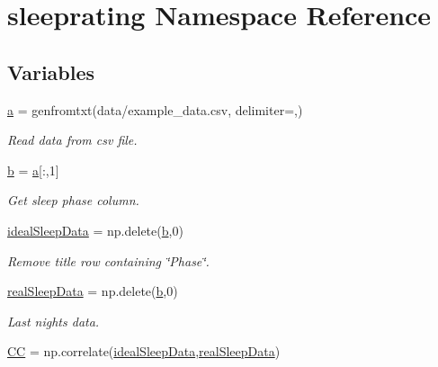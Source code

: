 \hypertarget{namespacesleeprating}{}\section{sleeprating Namespace Reference}
\label{namespacesleeprating}
\subsection*{Variables}
\begin{DoxyCompactItemize}
\item 
\mbox{\hyperlink{namespacesleeprating_a0d156bb774e867fc8ebea212853bd312}{a}} = genfromtxt(\textquotesingle{}data/example\+\_\+data.\+csv\textquotesingle{}, delimiter=\textquotesingle{},\textquotesingle{})
\begin{DoxyCompactList}\small\item\em Read data from csv file. \end{DoxyCompactList}\item 
\mbox{\hyperlink{namespacesleeprating_a0daef533b07f6252a2dad70552a90082}{b}} = \mbox{\hyperlink{namespacesleeprating_a0d156bb774e867fc8ebea212853bd312}{a}}\mbox{[}\+:,1\mbox{]}
\begin{DoxyCompactList}\small\item\em Get sleep phase column. \end{DoxyCompactList}\item 
\mbox{\hyperlink{namespacesleeprating_a9e349b9812b2428e147dc1612fa5126d}{ideal\+Sleep\+Data}} = np.\+delete(\mbox{\hyperlink{namespacesleeprating_a0daef533b07f6252a2dad70552a90082}{b}},0)
\begin{DoxyCompactList}\small\item\em Remove title row containing \char`\"{}\+Phase\char`\"{}. \end{DoxyCompactList}\item 
\mbox{\hyperlink{namespacesleeprating_a69adab626860ce563388eca964e80eb0}{real\+Sleep\+Data}} = np.\+delete(\mbox{\hyperlink{namespacesleeprating_a0daef533b07f6252a2dad70552a90082}{b}},0)
\begin{DoxyCompactList}\small\item\em Last nights data. \end{DoxyCompactList}\item 
\mbox{\hyperlink{namespacesleeprating_abe9d10de2c37eaa74afd164d3121680c}{CC}} = np.\+correlate(\mbox{\hyperlink{namespacesleeprating_a9e349b9812b2428e147dc1612fa5126d}{ideal\+Sleep\+Data}},\mbox{\hyperlink{namespacesleeprating_a69adab626860ce563388eca964e80eb0}{real\+Sleep\+Data}})

\end{DoxyCompactItemize}
